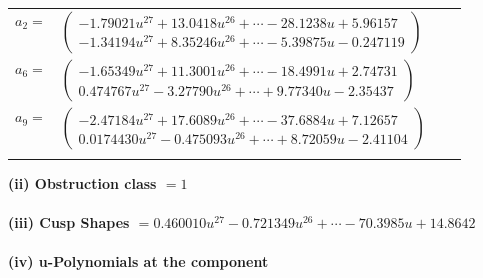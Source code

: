 \documentclass[1p]{elsarticle_modified}
\theoremstyle{definition}
\begin{document}
\begin{tabular}{m{7pt} m{180pt} m{7pt} m{180pt} }
\flushright $a_{2}=$&$\begin{pmatrix}-1.79021 u^{27}+13.0418 u^{26}+\cdots-28.1238 u+5.96157\\-1.34194 u^{27}+8.35246 u^{26}+\cdots-5.39875 u-0.247119\end{pmatrix}$ \\
\flushright $a_{6}=$&$\begin{pmatrix}-1.65349 u^{27}+11.3001 u^{26}+\cdots-18.4991 u+2.74731\\0.474767 u^{27}-3.27790 u^{26}+\cdots+9.77340 u-2.35437\end{pmatrix}$ \\
\flushright $a_{9}=$&$\begin{pmatrix}-2.47184 u^{27}+17.6089 u^{26}+\cdots-37.6884 u+7.12657\\0.0174430 u^{27}-0.475093 u^{26}+\cdots+8.72059 u-2.41104\end{pmatrix}$\\&\end{tabular}
\flushleft \textbf{(ii) Obstruction class $= 1$}\\~\\
\flushleft \textbf{(iii) Cusp Shapes $= 0.460010 u^{27}-0.721349 u^{26}+\cdots-70.3985 u+14.8642$}\\~\\
\newpage\renewcommand{\arraystretch}{1}
\flushleft \textbf{(iv) u-Polynomials at the component}\newline \\
\end{document}
